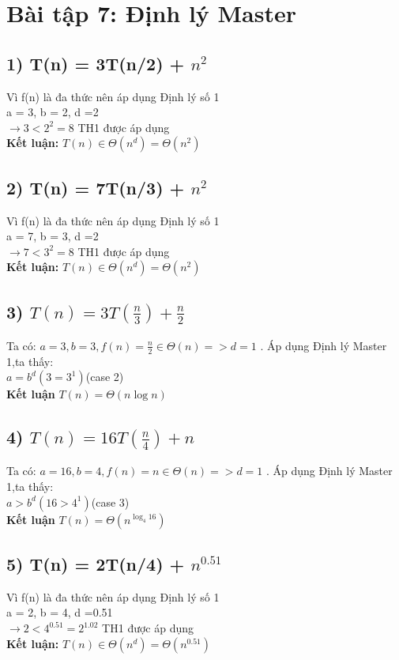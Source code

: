 \documentclass[10pt,a4paper]{article}
\begin{document}
\section*{Bài tập 7: Định lý Master} 
\subsection*{1) T(n) = 3T(n/2) + $n^2$}
Vì f(n) là đa thức nên áp dụng Định lý số 1\\
a = 3, b = 2, d =2 \\
$\rightarrow 3 < 2^2 = 8$ TH1 được áp dụng\\
\textbf{Kết luận: }$T(n) \in \Theta(n^d) = \Theta(n^2)$
\subsection*{2) T(n) = 7T(n/3) + $n^2$}
Vì f(n) là đa thức nên áp dụng Định lý số 1\\
a = 7, b = 3, d =2 \\
$\rightarrow 7 < 3^2 = 8$ TH1 được áp dụng\\
\textbf{Kết luận: }$T(n) \in \Theta(n^d) = \Theta(n^2)$
\subsection*{3) $T(n) = 3T(\frac{n}{3}) +\frac{n}{2}$}
Ta có: $a = 3, b = 3 , f(n) = \frac{n}{2} \in \Theta(n) => d = 1$ . Áp dụng Định lý Master 1,ta thấy:\\
$a = b^d (3=3^1)$(case 2)\\
\textbf{Kết luận} $T(n) = \Theta(n\log{n})$
\subsection*{4) $T(n) = 16T(\frac{n}{4}) + n$}
Ta có: $a = 16, b = 4 , f(n) = n \in \Theta(n) => d = 1$ . Áp dụng Định lý Master 1,ta thấy:\\
$a > b^d (16>4^1)$(case 3)\\
\textbf{Kết luận} $T(n) = \Theta(n^{\log_4{16}})$
\subsection*{5) T(n) = 2T(n/4) + $n^{0.51}$}
Vì f(n) là đa thức nên áp dụng Định lý số 1\\
a = 2, b = 4, d =0.51 \\
$\rightarrow 2 < 4^{0.51} = 2^{1.02}$ TH1 được áp dụng\\
\textbf{Kết luận: }$T(n) \in \Theta(n^d) = \Theta(n^{0.51})$
\end{document}
